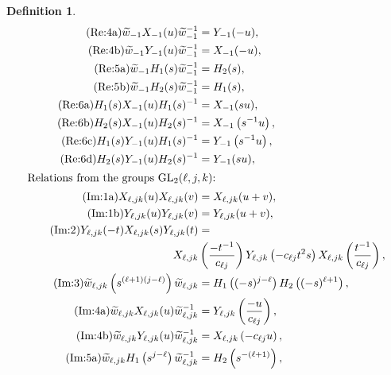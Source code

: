 \documentclass[11pt,letterpaper]{amsart}
\newcounter{thecounter}
\numberwithin{thecounter}{section}
\theoremstyle{definition}
\newtheorem{defn}[thecounter]{Definition}
\DeclareMathOperator{\GL}{GL}
\begin{document}
\begin{defn}
\begin{align*}
\tag{Re:4a}\label{GL2-G-wX}
  \widetilde{w}_{-1}X_{-1}(u)\widetilde{w}_{-1}^{-1}&=Y_{-1}(-u),\\
\tag{Re:4b}\label{GL2-G-wY}
  \widetilde{w}_{-1}Y_{-1}(u)\widetilde{w}_{-1}^{-1}&=X_{-1}(-u),\\
\tag{Re:5a}\label{GL2-G-wH1}
  {\widetilde{w}_{-1}} H_1(s)\widetilde{w}_{-1}^{-1} &= H_2(s),\\
\tag{Re:5b}\label{GL2-G-wH2}
  {\widetilde{w}_{-1}} H_2(s)\widetilde{w}_{-1}^{-1} &= H_1(s),\\
\tag{Re:6a}\label{GL2-G-H1X}
  H_1(s)X_{-1}(u)H_1(s)^{-1}&=X_{-1}(su),\\
\tag{Re:6b}\label{GL2-G-H2X}
  H_2(s)X_{-1}(u)H_2(s)^{-1}&=X_{-1}\left(s^{-1}u \right),\\
\tag{Re:6c}\label{GL2-G-H1Y}
  H_1(s)Y_{-1}(u)H_1(s)^{-1}&=Y_{-1}\left(s^{-1}u \right),\\
\tag{Re:6d}\label{GL2-G-H2Y}
  H_2(s)Y_{-1}(u)H_2(s)^{-1}&=Y_{-1}(su),\\
\intertext{Relations from the groups $\GL_2(\ell,j,k)$:}
\tag{Im:1a}\label{G-XX}
  X_{\ell,jk}(u)X_{\ell,jk}(v)&=X_{\ell,jk}(u+v),\\
\tag{Im:1b}\label{G-YY}
  Y_{\ell,jk}(u)Y_{\ell,jk}(v)&=Y_{\ell,jk}(u+v),\\
\tag{Im:2}\label{G-XY}
  Y_{\ell,jk}(-t)X_{\ell,jk}(s)Y_{\ell,jk}(t)&= \\
  \qquad \qquad X_{\ell,jk}&\left(\frac{-t^{-1}}{c_{\ell j}}\right)Y_{\ell,jk}\left(-c_{\ell j}t^2s\right)X_{\ell,jk}\left(\frac{t^{-1}}{c_{\ell j}}\right),\\
\tag{Im:3}\label{G-wwH}
  \widetilde{w}_{\ell,jk}\left(s^{(\ell+1)(j-\ell)} \right)\widetilde{w}_{\ell,jk}&=H_1\left((-s)^{j-\ell}\right) H_2\left((-s)^{\ell+1}\right), \\
\tag{Im:4a}\label{G-wX}
  \widetilde{w}_{\ell,jk} X_{\ell,jk}(u) {\widetilde{w}_{\ell,jk}}^{-1}&= Y_{\ell,jk}\left(\frac{-u}{c_{\ell j}}\right),\\
\tag{Im:4b}\label{G-wY}
  \widetilde{w}_{\ell,jk} Y_{\ell,jk}(u) {\widetilde{w}_{\ell,jk}}^{-1}&= X_{\ell,jk}\left(-c_{\ell j}u \right),\\
\tag{Im:5a}\label{G-wH1}
  \widetilde{w}_{\ell,jk} H_1\left(s^{j-\ell} \right) {\widetilde{w}_{\ell,jk}}^{-1}&=  H_2\left(s^{-(\ell+1)}\right),\\

\end{align*}
\end{defn}
\end{document}
